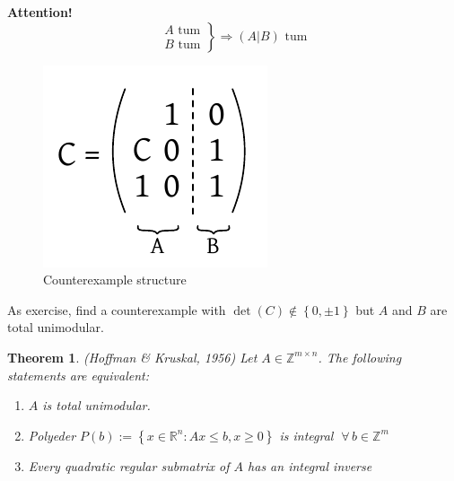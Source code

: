 \documentclass{article}
\newtheorem{theorem}{Theorem}
\newcommand{\set}[1]{\left\{#1\right\}}
\newcommand{\fall}{\;\forall\,}
\begin{document}
\textbf{Attention!}
  \[
    \left.\begin{array}{c}
      A \text{ tum} \\
      B \text{ tum}
    \end{array}\right\} \Rightarrow (A | B) \text{ tum}
  \]
  \begin{figure}[!ht]
    \begin{center}
      \includegraphics{img/tum_counterexample.pdf}
      \caption{Counterexample structure}
    \end{center}
  \end{figure}
  As exercise, find a counterexample with $\det(C) \notin \set{0, \pm 1}$ but $A$ and $B$ are total unimodular.

\begin{theorem}\label{satz-7.1}
  (Hoffman \& Kruskal, 1956)
  Let $A \in \mathbb{Z}^{m \times n}$. The following statements are equivalent:
  \begin{enumerate}
    \item $A$ is total unimodular.
    \item Polyeder $P(b) := \set{x \in \mathbb{R}^n: Ax \leq b, x \geq 0}$ is integral $\fall b \in \mathbb{Z}^m$
    \item Every quadratic regular submatrix of $A$ has an integral inverse
  \end{enumerate}
\end{theorem}
\end{document}

